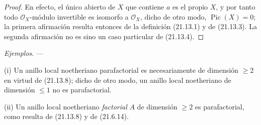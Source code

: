 \begin{proof}
En efecto, el único abierto de $X$ que contiene $a$ es el propio $X$, y por tanto todo
$\mathcal O_X$-módulo invertible es isomorfo a $\mathcal O_X$, dicho de otro modo,
$\operatorname{Pic}(X)=0$; la primera afirmación resulta entonces de la definición
(21.13.1) y de (21.13.3). La segunda afirmación no es sino un caso particular de
(21.13.4).
\end{proof}

\begin{env}[21.13.9]
\label{IV.21.13.9}
\emph{Ejemplos}. ---

(i) Un anillo local noetheriano parafactorial es necesariamente de dimensión
$\geq2$ en virtud de (21.13.8); dicho de otro modo, un anillo local noetheriano de
dimensión $\leq1$ no es parafactorial.

(ii) Un anillo local noetheriano \emph{factorial} $A$ de dimensión $\geq2$ es
parafactorial, como resulta de (21.13.8) y de (21.6.14).


\end{env}
